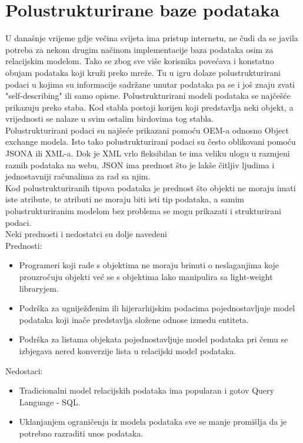 \documentclass[a4paper,12pt]{foi}
\begin{document}
\chapter{Polustrukturirane baze podataka}
U današnje vrijeme gdje večina svijeta ima pristup internetu, ne čudi da se javila potreba za nekom drugim načinom implementacije baza podataka osim za relacijskim modelom. Tako se zbog sve više korisnika povećava i konstatno obujam podataka koji kruži preko mreže. Tu u igru dolaze polustrukturirani podaci u kojima su informacije sadržane unutar podataka pa se i još znaju zvati "self-describing" ili samo opisne. Polustrukturirani modeli podataka se najčešće prikazuju preko staba. Kod stabla postoji korijen koji predstavlja neki objekt, a vrijednosti se nalaze u svim ostalim birdovima tog stabla.\\
Polustrukturirani podaci su najšeće prikazani pomoću OEM-a odnosno Object exchange modela. Isto tako polustrukturirani podaci su često oblikovani pomoću JSONA ili XML-a. Dok je XML vrlo fleksibilan te ima veliku ulogu u razmjeni raznih podataka na webu, JSON ima prednost što je lakše čitljiv ljudima i jednostavniji računalima za rad sa njim.\\
Kod polustrukturiranih tipova podataka je prednost što objekti ne moraju imati iste atribute, te atributi ne moraju biti isti tip podataka, a samim polustrukturiranim modelom bez problema se mogu prikazati i strukturirani podaci.\\ Neki prednosti i nedostatci su dolje navedeni\\

Prednosti:
\begin{itemize}
\item Programeri koji rade s objektima ne moraju brinuti
o neslaganjima koje prouzročuju objekti
već se s objektima lako manipulira sa light-weight libraryjem.
\item Podrška za ugniježđenim ili hijerarhijskim podacima
pojednostavljuje model podataka koji inače predstavlja složene odnose izmedu entiteta.
\item Podrška za listama objekata pojednostavljuje
model podataka pri čemu se izbjegava nered
konverzije lista u relacijski model podataka.
\end{itemize}

Nedostaci:
\begin{itemize}
\item Tradicionalni model relacijskih podataka
ima popularan i gotov Query Language - SQL.\\
\item Uklanjanjem ograničenja iz modela podataka
sve se manje promišlja da je potrebno razraditi unos podataka.
\end{itemize}
\citep{SSDB}
\end{document}
